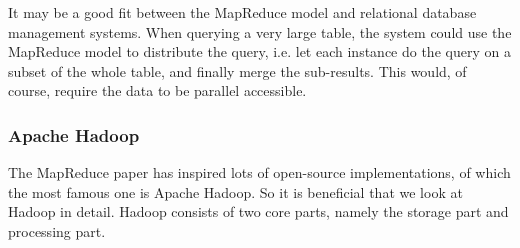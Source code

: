 \documentclass{article}
\begin{document}
It may be a good fit between the MapReduce model and relational database management systems. When querying a very large table, the system could use the MapReduce model to distribute the query, i.e. let each instance do the query on a subset of the whole table, and finally merge the sub-results. This would, of course, require the data to be parallel accessible.

\subsubsection{Apache Hadoop}

The MapReduce paper has inspired lots of open-source implementations, of which the most famous one is Apache Hadoop. So it is beneficial that we look at Hadoop in detail. Hadoop consists of two core parts, namely the storage part and processing part.
\end{document}
